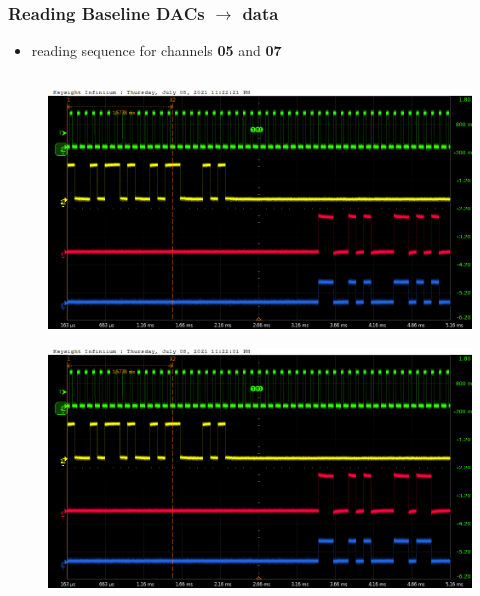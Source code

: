 \documentclass[aspectratio=169]{beamer}
\begin{document}
	\begin{frame}
	\frametitle{Reading Baseline DACs $\rightarrow$ data}
	\begin{itemize}
		\item reading sequence for channels \textbf{05} and \textbf{07}
	\end{itemize}
	\begin{columns}
		\begin{center}
			\begin{figure}
				\includegraphics[width=0.55 \textwidth]{IMG/probe/09-08-2021_ch05-read53-baselinedac1.png}
				\caption{}
			\end{figure}
			\begin{figure}
				\includegraphics[width=0.55 \textwidth]{IMG/probe/09-08-2021_ch05-read54-baselinedac1.png}
				\caption{}
			\end{figure}		
		\end{center}
		

\end{columns}
\end{frame}
\end{document}
